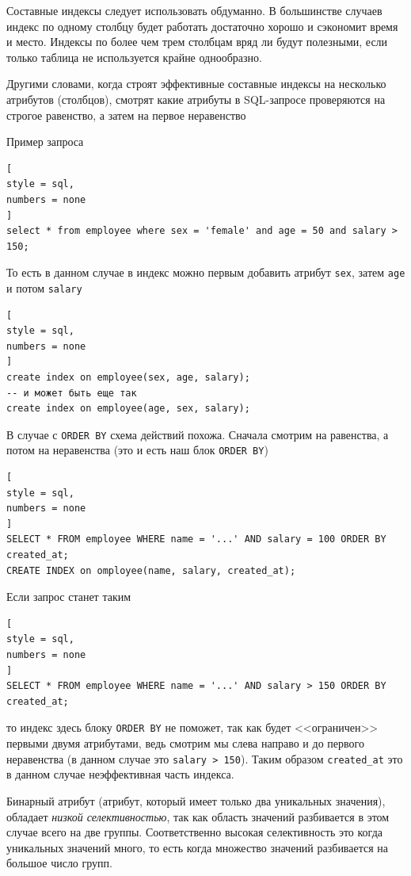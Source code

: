\documentclass[%
	11pt,
	a4paper,
	utf8,
		]{article}
\begin{document}
Составные индексы следует использовать обдуманно. В большинстве случаев индекс по одному столбцу будет работать достаточно хорошо и сэкономит время и место. Индексы по более чем трем столбцам вряд ли будут полезными, если только таблица не используется крайне однообразно.

Другими словами, когда строят эффективные составные индексы на несколько атрибутов (столбцов), смотрят какие атрибуты в SQL-запросе проверяются на строгое равенство, а затем на первое неравенство 

Пример запроса
\begin{lstlisting}[
style = sql,
numbers = none
]
select * from employee where sex = 'female' and age = 50 and salary > 150;
\end{lstlisting}

То есть в данном случае в индекс можно первым добавить атрибут \verb*|sex|, затем \verb*|age| и потом \verb*|salary|
\begin{lstlisting}[
style = sql,
numbers = none
]
create index on employee(sex, age, salary);
-- и может быть еще так
create index on employee(age, sex, salary);
\end{lstlisting}

В случае с \verb|ORDER BY| схема действий похожа. Сначала смотрим на равенства, а потом на неравенства (это и есть наш блок \verb|ORDER BY|)
\begin{lstlisting}[
style = sql,
numbers = none
]
SELECT * FROM employee WHERE name = '...' AND salary = 100 ORDER BY created_at;
CREATE INDEX on omployee(name, salary, created_at);
\end{lstlisting}

Если запрос станет таким
\begin{lstlisting}[
style = sql,
numbers = none
]
SELECT * FROM employee WHERE name = '...' AND salary > 150 ORDER BY created_at;
\end{lstlisting}
то индекс здесь блоку \verb|ORDER BY| не поможет, так как будет <<ограничен>> первыми двумя атрибутами, ведь смотрим мы слева направо и до первого неравенства (в данном случае это \verb|salary > 150|). Таким образом \verb*|created_at| это в данном случае неэффективная часть индекса.

Бинарный атрибут (атрибут, который имеет только два уникальных значения), обладает \emph{низкой селективностью}, так как область значений разбивается в этом случае всего на две группы. Соответственно высокая селективность это когда уникальных значений много, то есть когда множество значений разбивается на большое число групп.
\end{document}
